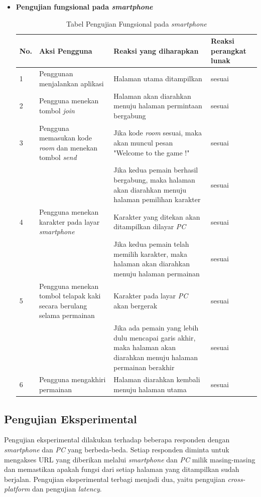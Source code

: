 \begin{itemize}
	\item \textbf{Pengujian fungsional pada \textit{smartphone}}
\begin{table}[H]
	\centering
	\caption{Tabel Pengujian Fungsional pada \textit{smartphone}}
	\begin{tabular}{|p{0.35cm}| p{3.5cm}| p{7cm}| p{2.5cm}|} \hline
		No. & Aksi Pengguna & Reaksi yang diharapkan & Reaksi perangkat lunak \\ \hline
		1 & Penggunan menjalankan aplikasi & Halaman utama ditampilkan & sesuai \\ \hline 
		2 & Pengguna menekan tombol \textit{join} & Halaman akan diarahkan menuju halaman permintaan bergabung & sesuai \\ \hline
		3 & Pengguna memasukan kode \textit{room} dan menekan tombol \textit{send} & Jika kode \textit{room} sesuai, maka akan muncul pesan "Welcome to the game !" & sesuai \\ \hline
		& & Jika kedua pemain berhasil bergabung, maka halaman akan diarahkan menuju halaman pemilihan karakter & sesuai \\ \hline
		4 & Pengguna menekan karakter pada layar \textit{smartphone} & Karakter yang ditekan akan ditampilkan dilayar \textit{PC} & sesuai \\ \hline
		& & Jika kedua pemain telah memilih karakter, maka halaman akan diarahkan menuju halaman permainan & sesuai \\ \hline
		5 & Pengguna menekan tombol telapak kaki secara berulang selama permainan & Karakter pada layar \textit{PC} akan bergerak & sesuai\\ \hline
		& & Jika ada pemain yang lebih dulu mencapai garis akhir, maka halaman akan diarahkan menuju halaman permainan berakhir & sesuai \\ \hline
		6 & Pengguna mengakhiri permainan & Halaman diarahkan kembali menuju halaman utama & sesuai \\ \hline
	\end{tabular}
	\label{table:fungsionalSmartphone}
\end{table}
\end{itemize} 
\subsection{Pengujian Eksperimental}
Pengujian eksperimental dilakukan terhadap beberapa responden dengan \textit{smartphone} dan \textit{PC} yang berbeda-beda. Setiap responden diminta untuk mengakses URL yang diberikan melalui \textit{smartphone} dan \textit{PC} milik masing-masing dan memastikan apakah fungsi dari setiap halaman yang ditampilkan sudah berjalan. Pengujian eksperimental terbagi menjadi dua, yaitu pengujian \textit{cross-platform} dan pengujian \textit{latency}.

